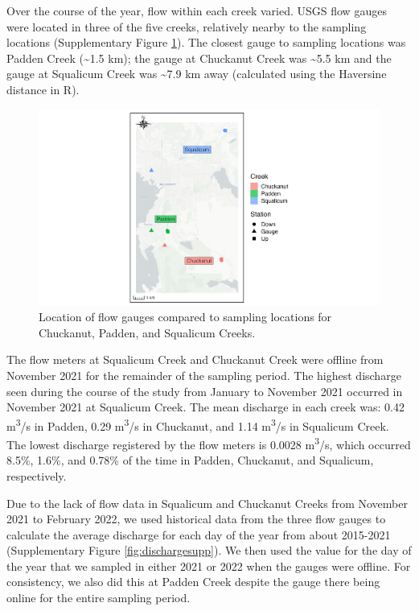 \documentclass[
]{article}
\begin{document}
Over the course of the year, flow within each creek varied. USGS flow
gauges were located in three of the five creeks, relatively nearby to
the sampling locations (Supplementary Figure \ref{fig:gaugemap}). The
closest gauge to sampling locations was Padden Creek (\textasciitilde1.5
km); the gauge at Chuckanut Creek was \textasciitilde5.5 km and the
gauge at Squalicum Creek was \textasciitilde7.9 km away (calculated
using the Haversine distance in R).

\begin{figure}
\centering
\includegraphics{../Output/SupplementalFigures/map_gauges.png}
\caption{Location of flow gauges compared to sampling locations for
Chuckanut, Padden, and Squalicum Creeks.\label{fig:gaugemap}}
\end{figure}

The flow meters at Squalicum Creek and Chuckanut Creek were offline from
November 2021 for the remainder of the sampling period. The highest
discharge seen during the course of the study from January to November
2021 occurred in November 2021 at Squalicum Creek. The mean discharge in
each creek was: 0.42 m\textsuperscript{3}/s in Padden, 0.29
m\textsuperscript{3}/s in Chuckanut, and 1.14 m\textsuperscript{3}/s in
Squalicum Creek. The lowest discharge registered by the flow meters is
0.0028 m\textsuperscript{3}/s, which occurred 8.5\%, 1.6\%, and 0.78\%
of the time in Padden, Chuckanut, and Squalicum, respectively.

Due to the lack of flow data in Squalicum and Chuckanut Creeks from
November 2021 to February 2022, we used historical data from the three
flow gauges to calculate the average discharge for each day of the year
from about 2015-2021 (Supplementary Figure \ref{fig:dischargesupp}). We
then used the value for the day of the year that we sampled in either
2021 or 2022 when the gauges were offline. For consistency, we also did
this at Padden Creek despite the gauge there being online for the entire
sampling period.
\end{document}
